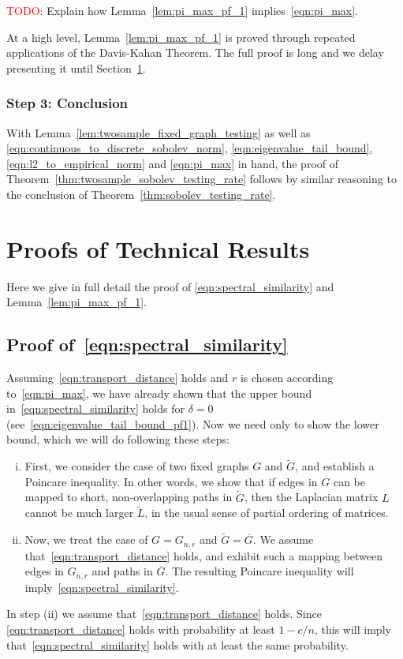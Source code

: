 \documentclass{article}
\newcommand{\1}{\mathbf{1}}
\newcommand{\wt}[1]{\widetilde{#1}}
\theoremstyle{alden}
\theoremstyle{aldenthm}
\theoremstyle{definition}
\theoremstyle{remark}
\begin{document}
\textcolor{red}{TODO}: Explain how Lemma~\ref{lem:pi_max_pf_1} implies~\eqref{eqn:pi_max}.


At a high level, Lemma~\ref{lem:pi_max_pf_1} is proved through repeated applications of the Davis-Kahan Theorem. The full proof is long and we delay presenting it until Section~\ref{sec:technical_lemma_proofs}.

\subsubsection{Step 3: Conclusion}

With Lemma~\ref{lem:twosample_fixed_graph_testing} as well as \eqref{eqn:continuous_to_discrete_sobolev_norm}, \eqref{eqn:eigenvalue_tail_bound}, \eqref{eqn:l2_to_empirical_norm} and \eqref{eqn:pi_max} in hand, the proof of Theorem~\ref{thm:twosample_sobolev_testing_rate} follows by similar reasoning to the conclusion of Theorem~\ref{thm:sobolev_testing_rate}.

\section{Proofs of Technical Results}
\label{sec:technical_lemma_proofs}

Here we give in full detail the proof of \eqref{eqn:spectral_similarity} and Lemma~\ref{lem:pi_max_pf_1}.



\subsection{Proof of~\eqref{eqn:spectral_similarity}}

Assuming~\eqref{eqn:transport_distance} holds and $r$ is chosen according to~\eqref{eqn:pi_max}, we have already shown that the upper bound in~\eqref{eqn:spectral_similarity} holds for $\delta = 0$ (see~\eqref{eqn:eigenvalue_tail_bound_pf1}). Now we need only to show the lower bound, which we will do following these steps:
\begin{enumerate}[(i)]
	\item First, we consider the case of two fixed graphs $G$ and $\wt{G}$, and establish a Poincare inequality. In other words, we show that if edges in $G$ can be mapped to short, non-overlapping paths in $\wt{G}$, then the Laplacian matrix $L$ cannot be much larger $\wt{L}$, in the usual sense of partial ordering of matrices.
	\item Now, we treat the case of $G = G_{n,r}$ and $\wt{G} = \overline{G}$. We assume that~\eqref{eqn:transport_distance} holds, and exhibit such a mapping between edges in $G_{n,r}$ and paths in $\overline{G}$. The resulting Poincare inequality will imply~\eqref{eqn:spectral_similarity}.
\end{enumerate}
In step (ii) we assume that~\eqref{eqn:transport_distance} holds. Since \eqref{eqn:transport_distance} holds with probability at least $1 - c/n$, this will imply that~\eqref{eqn:spectral_similarity} holds with at least the same probability.
\end{document}
